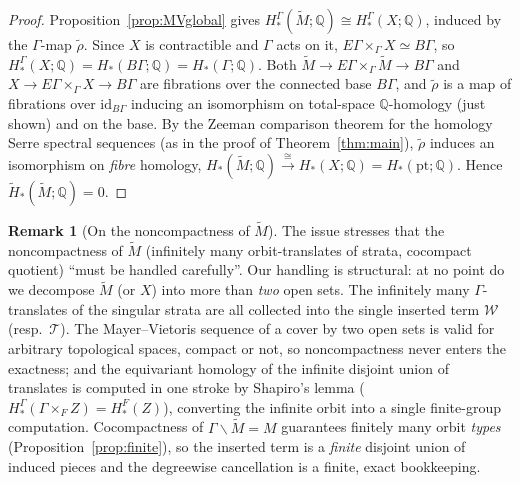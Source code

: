\documentclass[12pt]{article}
\theoremstyle{definition}
\newtheorem{remark}[theorem]{Remark}
\begin{document}
\begin{proof}
Proposition~\ref{prop:MVglobal} gives
$H^\Gamma_*(\widetilde M;\mathbb{Q})\cong H^\Gamma_*(X;\mathbb{Q})$, induced by the
$\Gamma$-map $\widetilde\rho$. Since $X$ is contractible and $\Gamma$ acts on it,
$E\Gamma\times_\Gamma X\simeq B\Gamma$, so
$H^\Gamma_*(X;\mathbb{Q})=H_*(B\Gamma;\mathbb{Q})=H_*(\Gamma;\mathbb{Q})$. Both
$\widetilde M\to E\Gamma\times_\Gamma\widetilde M\to B\Gamma$ and
$X\to E\Gamma\times_\Gamma X\to B\Gamma$ are fibrations over the connected base
$B\Gamma$, and $\widetilde\rho$ is a map of fibrations over $\mathrm{id}_{B\Gamma}$
inducing an isomorphism on total-space $\mathbb{Q}$-homology (just shown) and on
the base. By the Zeeman comparison theorem for the homology Serre spectral
sequences (as in the proof of Theorem~\ref{thm:main}), $\widetilde\rho$ induces an
isomorphism on \emph{fibre} homology,
$H_*(\widetilde M;\mathbb{Q})\xrightarrow{\cong}H_*(X;\mathbb{Q})
=H_*(\mathrm{pt};\mathbb{Q})$. Hence $\widetilde H_*(\widetilde M;\mathbb{Q})=0$.
\end{proof}

\begin{remark}[On the noncompactness of $\widetilde M$]
The issue stresses that the noncompactness of $\widetilde M$ (infinitely many
orbit-translates of strata, cocompact quotient) ``must be handled carefully''. Our
handling is structural: at no point do we decompose $\widetilde M$ (or $X$) into
more than \emph{two} open sets. The infinitely many $\Gamma$-translates of the
singular strata are all collected into the single inserted term $\mathcal W$
(resp.\ $\mathcal T$). The Mayer--Vietoris sequence of a cover by two open sets is
valid for arbitrary topological spaces, compact or not, so noncompactness never
enters the exactness; and the equivariant homology of the infinite disjoint union
of translates is computed in one stroke by Shapiro's lemma
($H^\Gamma_*(\Gamma\times_F Z)=H^F_*(Z)$), converting the infinite orbit into a
single finite-group computation. Cocompactness of $\Gamma\backslash\widetilde M=M$
guarantees finitely many orbit \emph{types} (Proposition~\ref{prop:finite}), so the
inserted term is a \emph{finite} disjoint union of induced pieces and the
degreewise cancellation is a finite, exact bookkeeping.
\end{remark}
\end{document}
